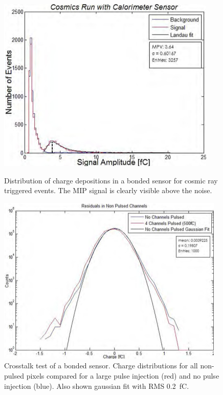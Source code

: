 \begin{figure}
	\centering
	\hspace*{\fill}
	\begin{minipage}[b]{.45\textwidth}
		\includegraphics[width=\linewidth,valign=t]{Calorimeter/SiliconTungstenSiD/cosmic.png}
		\caption{Distribution of charge depositions in a bonded sensor for cosmic ray triggered events. The MIP signal is clearly visible above the noise.}
		\label{fig:Calorimeter:SiDECAL:cosmic}
	\end{minipage}\hfill
	\begin{minipage}[b]{.36\textwidth}
		\includegraphics[width=\linewidth,valign=t]{Calorimeter/SiliconTungstenSiD/cross-talk.png}
		\caption{Crosstalk test of a bonded sensor. Charge distributions for all non-pulsed
	pixels compared for a large pulse injection
(red) and no pulse injection (blue).
Also shown gaussian fit with RMS \SI{0.2}{fC}.}
		\label{fig:Calorimeter:SiDECAL:cross-talk}
	\end{minipage}
	\hspace*{\fill}
\end{figure}

